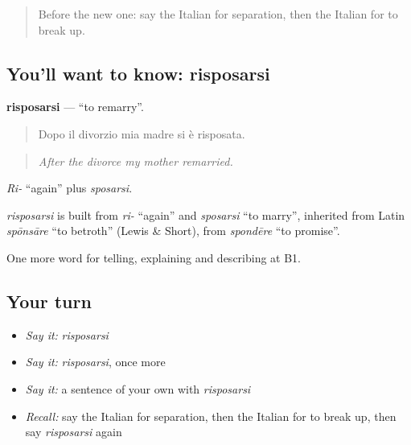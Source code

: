 \label{lesson:IT-C494-risposarsi}



\begin{quote}
Before the new one: say the Italian for separation, then the Italian for to break up.
\end{quote}

\subsection*{You'll want to know: risposarsi}
\textbf{risposarsi} — \textquotedblleft{}to remarry\textquotedblright{}.

\begin{quote}
Dopo il divorzio mia madre si è risposata.
\end{quote}

\begin{quote}
\emph{After the divorce my mother remarried.}
\end{quote}

\emph{Ri-} \textquotedblleft{}again\textquotedblright{} plus \emph{sposarsi}.

\begin{cousinweb}
\emph{risposarsi} is built from \emph{ri-} \textquotedblleft{}again\textquotedblright{} and \emph{sposarsi} \textquotedblleft{}to marry\textquotedblright{}, inherited from Latin \emph{spōnsāre} \textquotedblleft{}to betroth\textquotedblright{} (Lewis \& Short), from \emph{spondēre} \textquotedblleft{}to promise\textquotedblright{}.
\end{cousinweb}

\begin{grammarlens}[title={What you've built}]
One more word for telling, explaining and describing at B1.
\end{grammarlens}

\subsection*{Your turn}
\begin{itemize}
\raggedright
  \item \emph{Say it:} \emph{risposarsi}
  \item \emph{Say it:} \emph{risposarsi}, once more
  \item \emph{Say it:} a sentence of your own with \emph{risposarsi}
  \item \emph{Recall:} say the Italian for separation, then the Italian for to break up, then say \emph{risposarsi} again
\end{itemize}

